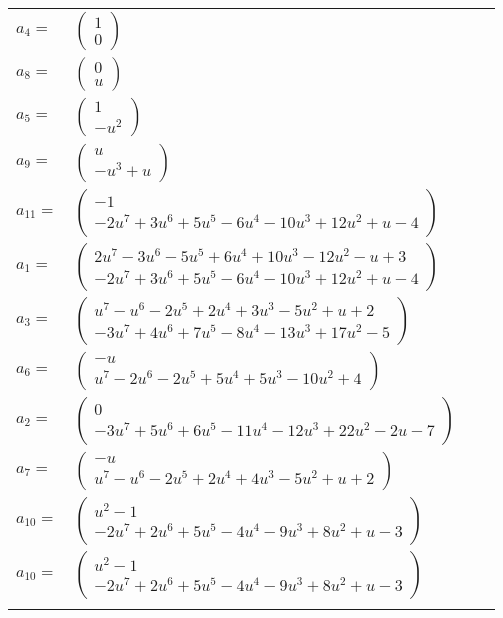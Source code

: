 \documentclass[1p]{elsarticle_modified}
\theoremstyle{definition}
\begin{document}
\begin{tabular}{m{7pt} m{180pt} m{7pt} m{180pt} }
\flushright $a_{4}=$&$\begin{pmatrix}1\\0\end{pmatrix}$ \\
\flushright $a_{8}=$&$\begin{pmatrix}0\\u\end{pmatrix}$ \\
\flushright $a_{5}=$&$\begin{pmatrix}1\\- u^2\end{pmatrix}$ \\
\flushright $a_{9}=$&$\begin{pmatrix}u\\- u^3+u\end{pmatrix}$ \\
\flushright $a_{11}=$&$\begin{pmatrix}-1\\-2 u^7+3 u^6+5 u^5-6 u^4-10 u^3+12 u^2+u-4\end{pmatrix}$ \\
\flushright $a_{1}=$&$\begin{pmatrix}2 u^7-3 u^6-5 u^5+6 u^4+10 u^3-12 u^2- u+3\\-2 u^7+3 u^6+5 u^5-6 u^4-10 u^3+12 u^2+u-4\end{pmatrix}$ \\
\flushright $a_{3}=$&$\begin{pmatrix}u^7- u^6-2 u^5+2 u^4+3 u^3-5 u^2+u+2\\-3 u^7+4 u^6+7 u^5-8 u^4-13 u^3+17 u^2-5\end{pmatrix}$ \\
\flushright $a_{6}=$&$\begin{pmatrix}- u\\u^7-2 u^6-2 u^5+5 u^4+5 u^3-10 u^2+4\end{pmatrix}$ \\
\flushright $a_{2}=$&$\begin{pmatrix}0\\-3 u^7+5 u^6+6 u^5-11 u^4-12 u^3+22 u^2-2 u-7\end{pmatrix}$ \\
\flushright $a_{7}=$&$\begin{pmatrix}- u\\u^7- u^6-2 u^5+2 u^4+4 u^3-5 u^2+u+2\end{pmatrix}$ \\
\flushright $a_{10}=$&$\begin{pmatrix}u^2-1\\-2 u^7+2 u^6+5 u^5-4 u^4-9 u^3+8 u^2+u-3\end{pmatrix}$\\ \flushright $a_{10}=$&$\begin{pmatrix}u^2-1\\-2 u^7+2 u^6+5 u^5-4 u^4-9 u^3+8 u^2+u-3\end{pmatrix}$\\&\end{tabular}
\end{document}
